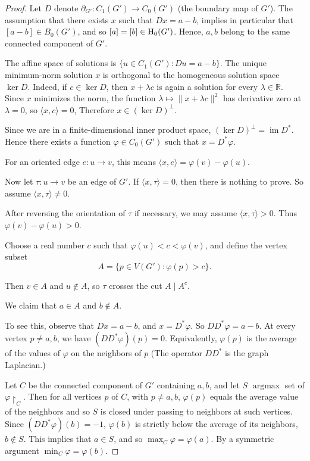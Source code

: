 \documentclass[11pt]{amsart}
\theoremstyle{theorem}
\theoremstyle{remark}
\theoremstyle{definition}
\newcommand{\R}{\mathbb{R}}
\newcommand{\im}{\operatorname{im}}
\newcommand{\HH}  {\mbox{\rm H}}
\begin{document}
\begin{proof}
Let
$D$ denote  $\partial_{G'}:C_1(G')\to C_0(G')
$
(the boundary map of \(G'\)). 
The assumption that there exists $x$ such that
$Dx=a-b$, implies in particular that $[a-b] \in B_0(G')$, and so 
$[a] = [b] \in \HH_0(G')$. Hence,
$a,b$ belong to the same connected component of $G'$.

The affine space of solutions is
$
\{u\in C_1(G'):Du=a-b\}
$.
The unique minimum-norm solution \(x\) is orthogonal to the homogeneous
solution space
$
\ker D
$.
Indeed, if \(c\in\ker D\), then \(x+\lambda c\) is again a solution for every
\(\lambda\in\R\). Since \(x\) minimizes the norm, the function
$
\lambda\mapsto \|x+\lambda c\|^2
$
has derivative zero at \(\lambda=0\), so
$
\langle x,c\rangle=0
$,
Therefore
$
x\in(\ker D)^\perp
$.

Since we are in a finite-dimensional inner product space,
$
(\ker D)^\perp=\im D^*
$.
Hence there exists a function
$
\varphi\in C_0(G')
$
such that
$
x=D^*\varphi
$.

For an oriented edge \(e:u\to v\), this means
$
\langle x,e\rangle
=
\varphi(v)-\varphi(u)
$.

Now let \(\tau:u\to v\) be an edge of \(G'\). If
$
\langle x,\tau\rangle=0
$,
then there is nothing to prove. So assume
$
\langle x,\tau\rangle\neq 0
$.

After reversing the orientation of \(\tau\) if necessary, we may assume
$
\langle x,\tau\rangle>0
$.
Thus
$
\varphi(v)-\varphi(u)>0.
$

Choose a real number \(c\) such that
$
\varphi(u)<c<\varphi(v)
$,
and define the vertex subset
\[
A=\{p\in V(G'):\varphi(p)>c\}.
\]

Then \(v\in A\) and \(u\notin A\), so \(\tau\) crosses the cut
$
A\mid A^c
$.

We claim that \(a\in A\) and \(b\notin A\).

To see this, observe that
$
Dx=a-b
$,
and 
\(x=D^*\varphi\). So 
$
DD^*\varphi=a-b
$.
At every vertex \(p\neq a,b\), we have
$
(DD^*\varphi)(p)=0
$.
Equivalently, \(\varphi(p)\) is the average of the values of \(\varphi\) on
the neighbors of \(p\)%
(The operator \(DD^*\) is the graph Laplacian.) 

Let $C$ be the connected component of $G'$ containing $a,b$, and let $S$
$\operatorname{argmax}$ set of $\varphi\restriction_C$.
Then for all vertices $p$ of $C$, with $p\neq a,b$, $\varphi(p)$ equals the average value of the neighbors and so $S$ is closed under passing to neighbors at such vertices. Since $(DD^*\varphi)(b) = -1$, $\varphi(b)$ is strictly below the average of its neighbors, $b \not\in S$.  This implies that $a \in S$, and so $\max_C \varphi = \varphi(a)$.
By a symmetric argument $\min_C \varphi = \varphi(b)$.


\end{proof}
\end{document}
